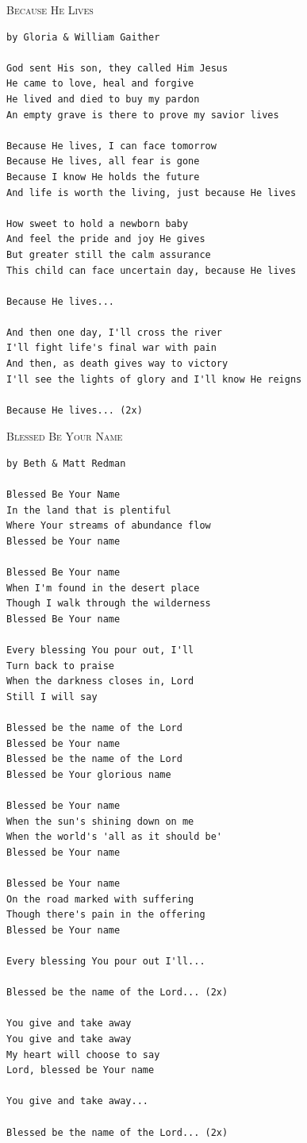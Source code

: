 \documentclass[10pt,oneside,footinclude=true,headinclude=true]{scrbook} %
\newcommand\songtitle[1]{
	\hspace*{-3.7mm}\Large\textsc{#1}
}
\begin{document}

\bigskip
\medskip
\songtitle{Because He Lives}
\begin{verbatim}
by Gloria & William Gaither

God sent His son, they called Him Jesus
He came to love, heal and forgive
He lived and died to buy my pardon
An empty grave is there to prove my savior lives

Because He lives, I can face tomorrow
Because He lives, all fear is gone
Because I know He holds the future
And life is worth the living, just because He lives

How sweet to hold a newborn baby
And feel the pride and joy He gives
But greater still the calm assurance
This child can face uncertain day, because He lives

Because He lives...

And then one day, I'll cross the river
I'll fight life's final war with pain
And then, as death gives way to victory
I'll see the lights of glory and I'll know He reigns

Because He lives... (2x)
\end{verbatim}


\bigskip
\medskip
\songtitle{Blessed Be Your Name}
\begin{verbatim}
by Beth & Matt Redman

Blessed Be Your Name
In the land that is plentiful
Where Your streams of abundance flow
Blessed be Your name

Blessed Be Your name
When I'm found in the desert place
Though I walk through the wilderness
Blessed Be Your name

Every blessing You pour out, I'll
Turn back to praise
When the darkness closes in, Lord
Still I will say

Blessed be the name of the Lord
Blessed be Your name
Blessed be the name of the Lord
Blessed be Your glorious name

Blessed be Your name
When the sun's shining down on me
When the world's 'all as it should be'
Blessed be Your name

Blessed be Your name
On the road marked with suffering
Though there's pain in the offering
Blessed be Your name

Every blessing You pour out I'll...

Blessed be the name of the Lord... (2x)

You give and take away
You give and take away
My heart will choose to say
Lord, blessed be Your name

You give and take away...

Blessed be the name of the Lord... (2x)
\end{verbatim}
\end{document}
